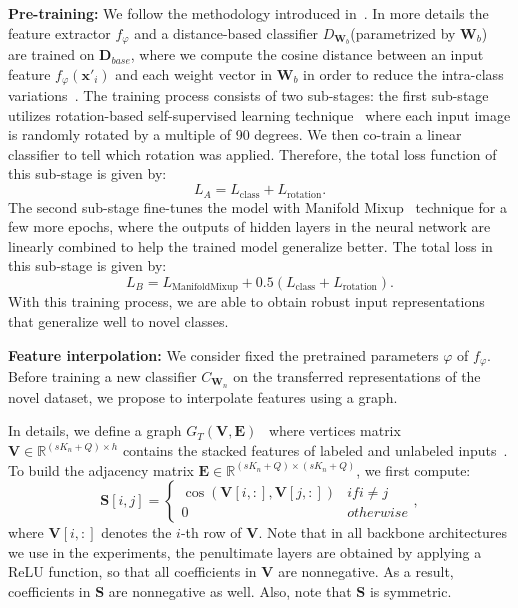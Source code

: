 \documentclass[a4paper,conference]{IEEEtran}
\begin{document}
\textbf{Pre-training:} We follow the methodology introduced in~\cite{mangla2020charting}. In more details the feature extractor $f_\varphi$ and a distance-based classifier $D_{\mathbf{W}_b}$(parametrized by $\mathbf{W}_b$)~\cite{mensink2012metric} are trained on $\mathbf{D}_{base}$, where we compute the cosine distance between an input feature $f_\varphi(\mathbf{x'}_i)$ and each weight vector in $\mathbf{W}_b$ in order to reduce the intra-class variations~\cite{chen2019closer}. The training process consists of two sub-stages: the first sub-stage utilizes rotation-based self-supervised learning technique~\cite{gidaris2018unsupervised} where each input image is randomly rotated by a multiple of 90 degrees. We then co-train a linear classifier to tell which rotation was applied. Therefore, the total loss function of this sub-stage is given by:
\begin{equation}
L_A=L_\text{class}+L_\text{rotation}.
\label{eq:loss1}
\end{equation}
The second sub-stage fine-tunes the model with Manifold Mixup~\cite{verma2018manifold} technique for a few more epochs, where the outputs of hidden layers in the neural network are linearly combined to help the trained model generalize better. The total loss in this sub-stage is given by:
\begin{equation}
L_B=L_\text{ManifoldMixup} + 0.5(L_\text{class}+L_\text{rotation}).
\label{eq:loss2}
\end{equation}
With this training process, we are able to obtain robust input representations that generalize well to novel classes.

\textbf{Feature interpolation:} We consider fixed the pretrained parameters $\varphi$ of $f_\varphi$. Before training a new classifier $C_{\mathbf{W}_n}$ on the transferred representations of the novel dataset, we propose to interpolate features using a graph.

In details, we define a graph $G_T(\mathbf{V}, \textbf{E})$~\cite{kipf2016semi} where vertices matrix $\mathbf{V}\in\mathbb{R}^{(s K_n+Q)\times h}$ contains the stacked features of labeled and unlabeled inputs~\cite{garcia2017few}. To build the adjacency matrix $\mathbf{E}\in\mathbb{R}^{(s K_n+Q)\times (s K_n+Q)}$, we first compute:
\begin{equation}
\mathbf{S}[i,j]=\left\{\begin{array}{ll}\cos(\mathbf{V}[i,:],\mathbf{V}[j,:])& \text{$if $} i \neq j\\0 & \text{$otherwise$}\end{array}\right.,
\label{eq:simfunc}
\end{equation}
where $\mathbf{V}[i,:]$ denotes the $i$-th row of $\mathbf{V}$. Note that in all backbone architectures we use in the experiments, the penultimate layers are obtained by applying a ReLU function, so that all coefficients in $\mathbf{V}$ are nonnegative. As a result, coefficients in $\mathbf{S}$ are nonnegative as well. Also, note that $\mathbf{S}$ is symmetric.
\end{document}
